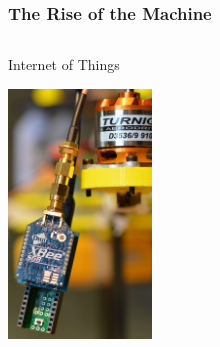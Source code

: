 \documentclass[10pt]{beamer}
\begin{document}
\begin{frame}
\frametitle{The Rise of the Machine}
\begin{columns}
\begin{block}{Internet of Things}
  \begin{center}
  \includegraphics[width=1.5in]{Figures/Machine-Micro.jpg}
  \end{center}
\end{block}
\end{columns}
\end{frame}
\end{document}
